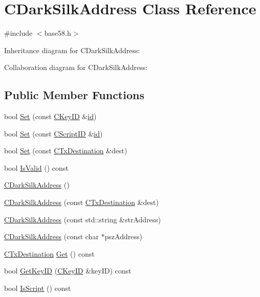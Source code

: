\hypertarget{class_c_dark_silk_address}{}\section{C\+Dark\+Silk\+Address Class Reference}
\label{class_c_dark_silk_address}


{\ttfamily \#include $<$base58.\+h$>$}



Inheritance diagram for C\+Dark\+Silk\+Address\+:


Collaboration diagram for C\+Dark\+Silk\+Address\+:
\subsection*{Public Member Functions}
\begin{DoxyCompactItemize}
\item 
bool \hyperlink{class_c_dark_silk_address_adafb09872a993f450999c4e4ea0e795b}{Set} (const \hyperlink{class_c_key_i_d}{C\+Key\+I\+D} \&\hyperlink{db__test_8cc_a7441ef0865bcb3db9b8064dd7375c1ea}{id})
\item 
bool \hyperlink{class_c_dark_silk_address_a8c9a41628a14007896053a4369450fb3}{Set} (const \hyperlink{class_c_script_i_d}{C\+Script\+I\+D} \&\hyperlink{db__test_8cc_a7441ef0865bcb3db9b8064dd7375c1ea}{id})
\item 
bool \hyperlink{class_c_dark_silk_address_af9df1160053b931a3a64d2d96e24506e}{Set} (const \hyperlink{keystore_8h_a8f46ecba0ddeb036be6b58d6ed1909cd}{C\+Tx\+Destination} \&dest)
\item 
bool \hyperlink{class_c_dark_silk_address_ab98113189d0746ea660447efe3700103}{Is\+Valid} () const 
\item 
\hyperlink{class_c_dark_silk_address_a4bbd665731f12aa75a20630ac3698794}{C\+Dark\+Silk\+Address} ()
\item 
\hyperlink{class_c_dark_silk_address_ac1364842bceba92a0d811637d6dd360a}{C\+Dark\+Silk\+Address} (const \hyperlink{keystore_8h_a8f46ecba0ddeb036be6b58d6ed1909cd}{C\+Tx\+Destination} \&dest)
\item 
\hyperlink{class_c_dark_silk_address_a3d493985b3ca92d72d9ffe9251082f46}{C\+Dark\+Silk\+Address} (const std\+::string \&str\+Address)
\item 
\hyperlink{class_c_dark_silk_address_a42fe9fc2e904a2bed7b140d16a0d7b9b}{C\+Dark\+Silk\+Address} (const char $\ast$psz\+Address)
\item 
\hyperlink{keystore_8h_a8f46ecba0ddeb036be6b58d6ed1909cd}{C\+Tx\+Destination} \hyperlink{class_c_dark_silk_address_a907e63758c7914a246b5807f6babf97d}{Get} () const 
\item 
bool \hyperlink{class_c_dark_silk_address_ab305645f49be30fdeac6290debf029ec}{Get\+Key\+I\+D} (\hyperlink{class_c_key_i_d}{C\+Key\+I\+D} \&key\+I\+D) const 
\item 
bool \hyperlink{class_c_dark_silk_address_aae1f7d243d122e41b4cddf481c6b0543}{Is\+Script} () const 
\end{DoxyCompactItemize}
